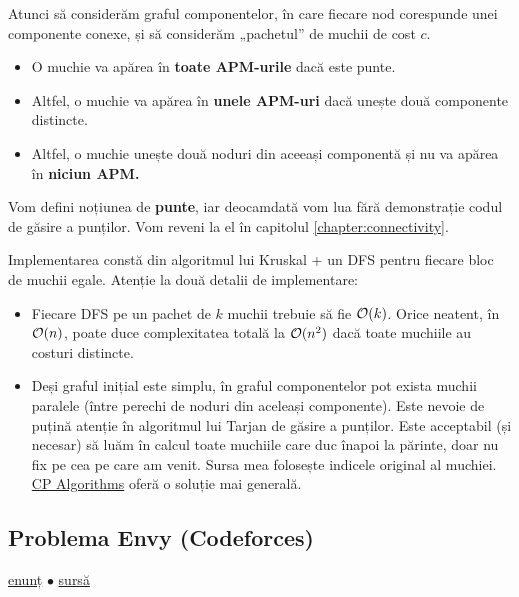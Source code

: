 \documentclass[../main.tex]{subfiles}
\begin{document}
Atunci să considerăm graful componentelor, în care fiecare nod corespunde unei componente conexe, și să considerăm „pachetul” de muchii de cost $c$.

\begin{itemize}
  \item O muchie va apărea în \textbf{toate APM-urile} dacă este punte.

  \item Altfel, o muchie va apărea în \textbf{unele APM-uri} dacă unește două componente distincte.

  \item Altfel, o muchie unește două noduri din aceeași componentă și nu va apărea în \textbf{niciun APM.}
\end{itemize}

Vom defini noțiunea de \textbf{punte}, iar deocamdată vom lua fără demonstrație codul de găsire a punților. Vom reveni la el în capitolul \ref{chapter:connectivity}.

Implementarea constă din algoritmul lui Kruskal + un DFS pentru fiecare bloc de muchii egale. Atenție la două detalii de implementare:

\begin{itemize}
  \item Fiecare DFS pe un pachet de $k$ muchii trebuie să fie $\mathcal{O}(k)$. Orice  neatent, în $\mathcal{O}(n)$, poate duce complexitatea totală la $\mathcal{O}(n^2)$ dacă toate muchiile au costuri distincte.

  \item Deși graful inițial este simplu, în graful componentelor pot exista muchii paralele (între perechi de noduri din aceleași componente). Este nevoie de puțină atenție în algoritmul lui Tarjan de găsire a punților. Este acceptabil (și necesar) să luăm în calcul toate muchiile care duc înapoi la părinte, doar nu fix pe cea pe care am venit. Sursa mea folosește indicele original al muchiei. \href{https://cp-algorithms.com/graph/bridge-searching.html#implementation}{CP Algorithms} oferă o soluție mai generală.
\end{itemize}

\subsection{Problema Envy (Codeforces)}
\label{problem:envy}

\href{https://codeforces.com/contest/891/problem/C}{enunț}
$\bullet$
\hyperref[code:envy]{sursă}
\end{document}
